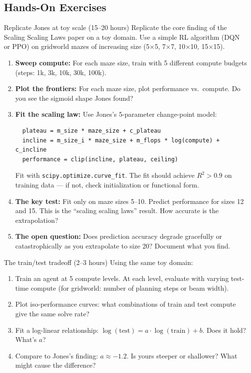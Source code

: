 \subsection{Hands-On Exercises}

\begin{exercise}{Replicate Jones at toy scale (15--20 hours)}
Replicate the core finding of the Scaling Scaling Laws paper on a toy domain. Use a simple RL algorithm (DQN or PPO) on gridworld mazes of increasing size (5$\times$5, 7$\times$7, 10$\times$10, 15$\times$15).

\begin{enumerate}
  \item \textbf{Sweep compute:} For each maze size, train with 5 different compute budgets (steps: 1k, 3k, 10k, 30k, 100k).
  \item \textbf{Plot the frontiers:} For each maze size, plot performance vs.\ compute. Do you see the sigmoid shape Jones found?
  \item \textbf{Fit the scaling law:} Use Jones's 5-parameter change-point model:
  \begin{lstlisting}
  plateau = m_size * maze_size + c_plateau
  incline = m_size_i * maze_size + m_flops * log(compute) + c_incline
  performance = clip(incline, plateau, ceiling)
  \end{lstlisting}
  Fit with \texttt{scipy.optimize.curve\_fit}. The fit should achieve $R^2 > 0.9$ on training data --- if not, check initialization or functional form.
  \item \textbf{The key test:} Fit only on maze sizes 5--10. Predict performance for sizes 12 and 15. This is the ``scaling scaling laws'' result. How accurate is the extrapolation?
  \item \textbf{The open question:} Does prediction accuracy degrade gracefully or catastrophically as you extrapolate to size 20? Document what you find.
\end{enumerate}
\end{exercise}

\begin{exercise}{The train/test tradeoff (2--3 hours)}
Using the same toy domain:

\begin{enumerate}
  \item Train an agent at 5 compute levels. At each level, evaluate with varying test-time compute (for gridworld: number of planning steps or beam width).
  \item Plot iso-performance curves: what combinations of train and test compute give the same solve rate?
  \item Fit a log-linear relationship: $\log(\text{test}) = a \cdot \log(\text{train}) + b$. Does it hold? What's $a$?
  \item Compare to Jones's finding: $a \approx -1.2$. Is yours steeper or shallower? What might cause the difference?
\end{enumerate}
\end{exercise}

